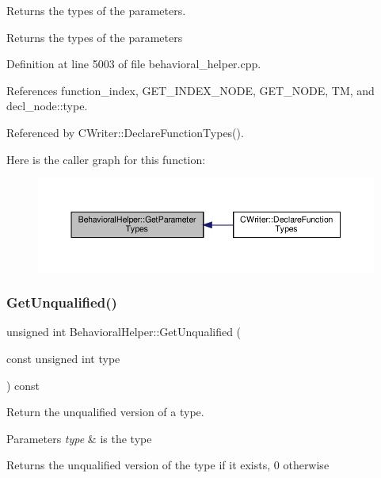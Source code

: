 Returns the types of the parameters. 

\begin{DoxyReturn}{Returns}
the types of the parameters 
\end{DoxyReturn}


Definition at line 5003 of file behavioral\+\_\+helper.\+cpp.



References function\+\_\+index, G\+E\+T\+\_\+\+I\+N\+D\+E\+X\+\_\+\+N\+O\+DE, G\+E\+T\+\_\+\+N\+O\+DE, TM, and decl\+\_\+node\+::type.



Referenced by C\+Writer\+::\+Declare\+Function\+Types().

Here is the caller graph for this function\+:
\nopagebreak
\begin{figure}[H]
\begin{center}
\leavevmode
\includegraphics[width=350pt]{dd/db2/classBehavioralHelper_a8f8fdd077000ffb5326af5d5bad2c664_icgraph}
\end{center}
\end{figure}
\mbox{\label{classBehavioralHelper_abf4e55bf4abfce3b7a49a58803e73f66}} 
\subsubsection{\texorpdfstring{Get\+Unqualified()}{GetUnqualified()}}
{\footnotesize\ttfamily unsigned int Behavioral\+Helper\+::\+Get\+Unqualified (\begin{DoxyParamCaption}\item[{const unsigned int}]{type }\end{DoxyParamCaption}) const}



Return the unqualified version of a type. 


\begin{DoxyParams}{Parameters}
{\em type} & is the type \\
\hline
\end{DoxyParams}
\begin{DoxyReturn}{Returns}
the unqualified version of the type if it exists, 0 otherwise 
\end{DoxyReturn}


